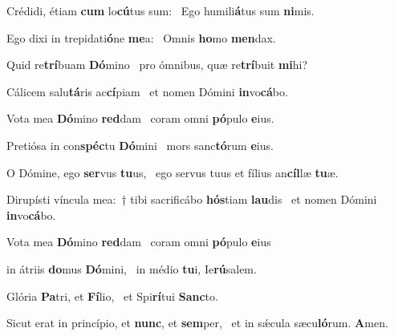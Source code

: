 \item Crédidi, étiam \textbf{cum} lo\textbf{cú}tus sum:~\psstar{} Ego humili\textbf{á}tus sum \textbf{ni}mis.

\item Ego dixi in trepidati\textbf{ó}ne \textbf{me}a:~\psstar{} Omnis \textbf{ho}mo \textbf{men}dax.

\item Quid re\textbf{trí}buam \textbf{Dó}mino~\psstar{} pro ómnibus, quæ re\textbf{trí}buit \textbf{mi}hi?

\item Cálicem salu\textbf{tá}ris ac\textbf{cí}piam~\psstar{} et nomen Dómini \textbf{in}vo\textbf{cá}bo.

\item Vota mea \textbf{Dó}mino \textbf{red}dam~\psstar{} coram omni \textbf{pó}pulo \textbf{e}ius.

\item Pretiósa in con\textbf{spéc}tu \textbf{Dó}mini~\psstar{} mors sanc\textbf{tó}rum \textbf{e}ius.

\item O Dómine, ego \textbf{ser}vus \textbf{tu}us,~\psstar{} ego servus tuus et fílius an\textbf{cíl}læ \textbf{tu}æ.

\item Dirupísti víncula mea:~† tibi sacrificábo \textbf{hós}tiam \textbf{lau}dis~\psstar{} et nomen Dómini \textbf{in}vo\textbf{cá}bo.

\item Vota mea \textbf{Dó}mino \textbf{red}dam~\psstar{} coram omni \textbf{pó}pulo \textbf{e}ius

\item in átriis \textbf{do}mus \textbf{Dó}mini,~\psstar{} in médio \textbf{tu}i, Ie\textbf{rú}salem.

\item Glória \textbf{Pa}tri, et \textbf{Fí}lio,~\psstar{} et Spi\textbf{rí}tui \textbf{Sanc}to.

\item Sicut erat in princípio, et \textbf{nunc}, et \textbf{sem}per,~\psstar{} et in sǽcula sæcu\textbf{ló}rum. \textbf{A}men.